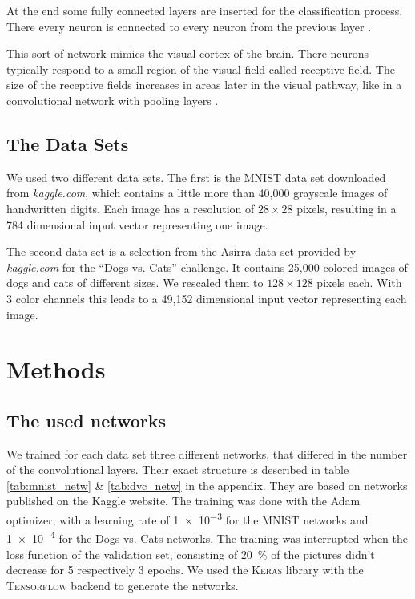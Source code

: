 \documentclass[%
 reprint,
 amsmath,amssymb,
 aps,
]{revtex4-1}
\begin{document}
At the end some fully connected layers are inserted for the classification process. There every neuron is connected to every neuron from the previous layer \cite{Goodfellow-et-al-2016}.

This sort of network mimics the visual cortex of the brain. There neurons typically respond to a small region of the visual field called receptive field. The size of the receptive fields increases in areas later in the visual pathway, like in a convolutional network with pooling layers \cite{visualCortex}.

\subsection{The Data Sets}

We used two different data sets. The first is the MNIST data set downloaded from \emph{kaggle.com}, which contains a little more than 40,000 grayscale images of handwritten digits. Each image has a resolution of $28\times 28$ pixels, resulting in a 784 dimensional input vector representing one image. 

The second data set is a selection from the Asirra data set provided by \emph{kaggle.com} for the ``Dogs vs. Cats'' challenge. It contains 25,000 colored images of dogs and cats of different sizes. We rescaled them to $128\times 128$ pixels each. With 3 color channels this leads to a 49,152 dimensional input vector representing each image. 
\section{Methods}

\subsection{The used networks}

We trained for each data set three different networks, that differed in the number of the convolutional layers. Their exact structure is described in table \ref{tab:mnist_netw} \& \ref{tab:dvc_netw} in the appendix. They are based on networks published on the Kaggle website. The training was done with the Adam optimizer, with a learning rate of \SI{1e-3}{} for the MNIST networks and \SI{1e-4}{} for the Dogs vs. Cats networks. The training was interrupted when the loss function of the validation set, consisting of \SI{20}{\percent} of the pictures didn't decrease for 5 respectively 3 epochs. 
We used the \textsc{Keras} library with the \textsc{Tensorflow} backend to generate the networks.
\end{document}
